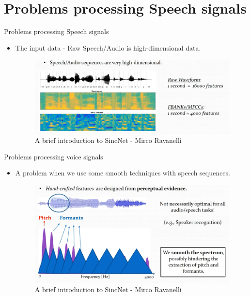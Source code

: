\documentclass[11pt]{beamer}
\begin{document}
\section{Problems processing Speech signals}
\begin{frame}{Problems processing Speech signals}
	\begin{itemize}
		\item The input data - Raw Speech/Audio is high-dimensional data.
		\begin{figure}[H]
			\includegraphics[width=1\linewidth]{images/capture_01.png}
			\caption{A brief introduction to SincNet - Mirco Ravanelli}
			\label{fig:writing-thesis}
		\end{figure}
	\end{itemize}
\end{frame}
\begin{frame}{Problems processing voice signals}
	\begin{itemize}
		\item A problem when we use some smooth techniques with speech sequences.
		\begin{figure}[H]
			\includegraphics[width=1\linewidth]{images/perceptual_evidence.png}
			\caption{A brief introduction to SincNet - Mirco Ravanelli}
			\label{fig:writing-thesis}
		\end{figure}
	\end{itemize}
\end{frame}
\end{document}

